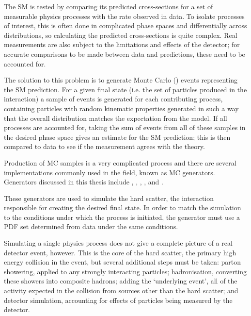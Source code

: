 
The \ac{SM} is tested by comparing its predicted cross-sections for a set of
measurable physics processes with the rate observed in data. To isolate
processes of interest, this is often done in complicated phase spaces and
differentially across distributions, so calculating the predicted cross-sections
is quite complex. Real measurements are also subject to the limitations and
effects of the detector; for accurate comparisons to be made between data and
predictions, these need to be accounted for.

The solution to this problem is to generate Monte Carlo () events
representing the \ac{SM} prediction. For a given final state (i.e. the set of
particles produced in the interaction) a sample of events is generated for each
contributing process, containing particles with random kinematic properties
generated in such a way that the overall distribution matches the expectation
from the model. If all processes are accounted for, taking the sum of events
from all of these samples in the desired phase space gives an estimate for the
\ac{SM} prediction; this is then compared to data to see if the measurement
agrees with the theory.

Production of \ac{MC} samples is a very complicated process and there are
several implementations commonly used in the field, known as
\ac{MC} generators. Generators discussed in this thesis include \madgraph
\cite{madgraph5amc}, \sherpa \cite{sherpa2dot2}, \pythia \cite{pythia8dot2},
\powheg \cite{powheg}, and \herwig \cite{herwigpp}.

These generators are used to simulate the hard scatter, the interaction
responsible for creating the desired final state. In order to match the
simulation to the conditions under which the process is initiated, the generator
must use a \ac{PDF} set determined from data under the same conditions.

Simulating a single physics process does not give a complete picture of a real
detector event, however. This is the core of the hard scatter, the primary high
energy collision in the event, but several additional steps must be taken:
parton showering, applied to any strongly interacting particles; hadronisation,
converting these showers into composite hadrons; adding the `underlying event',
all of the activity expected in the collision from sources other than the hard
scatter; and detector simulation, accounting for effects of particles being
measured by the detector.

